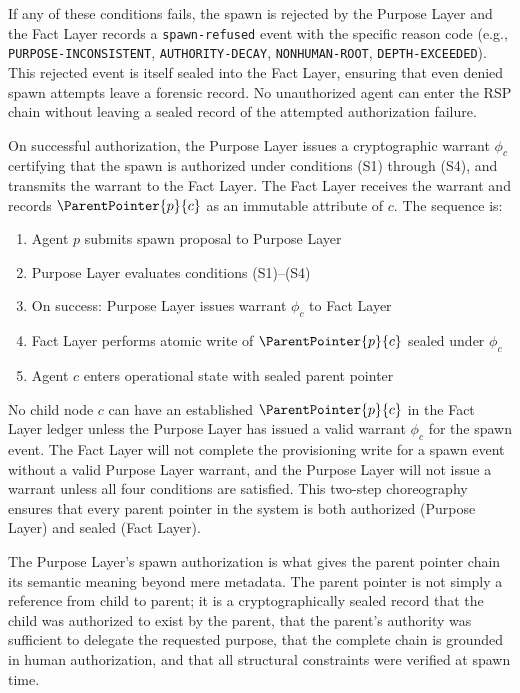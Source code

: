 If any of these conditions fails, the spawn is rejected by the Purpose Layer and the Fact Layer records a \texttt{spawn-refused} event with the specific reason code (e.g., \texttt{PURPOSE-INCONSISTENT}, \texttt{AUTHORITY-DECAY}, \texttt{NONHUMAN-ROOT}, \texttt{DEPTH-EXCEEDED}). This rejected event is itself sealed into the Fact Layer, ensuring that even denied spawn attempts leave a forensic record. No unauthorized agent can enter the RSP chain without leaving a sealed record of the attempted authorization failure.

On successful authorization, the Purpose Layer issues a cryptographic warrant $\phi_c$ certifying that the spawn is authorized under conditions (S1) through (S4), and transmits the warrant to the Fact Layer. The Fact Layer receives the warrant and records $\ParentPointer{p}{c}$ as an immutable attribute of $c$. The sequence is:

\begin{enumerate}
    \item Agent $p$ submits spawn proposal to Purpose Layer
    \item Purpose Layer evaluates conditions (S1)–(S4)
    \item On success: Purpose Layer issues warrant $\phi_c$ to Fact Layer
    \item Fact Layer performs atomic write of $\ParentPointer{p}{c}$ sealed under $\phi_c$
    \item Agent $c$ enters operational state with sealed parent pointer
\end{enumerate}

No child node $c$ can have an established $\ParentPointer{p}{c}$ in the Fact Layer ledger unless the Purpose Layer has issued a valid warrant $\phi_c$ for the spawn event. The Fact Layer will not complete the provisioning write for a spawn event without a valid Purpose Layer warrant, and the Purpose Layer will not issue a warrant unless all four conditions are satisfied. This two-step choreography ensures that every parent pointer in the system is both authorized (Purpose Layer) and sealed (Fact Layer).

The Purpose Layer's spawn authorization is what gives the parent pointer chain its semantic meaning beyond mere metadata. The parent pointer is not simply a reference from child to parent; it is a cryptographically sealed record that the child was authorized to exist by the parent, that the parent's authority was sufficient to delegate the requested purpose, that the complete chain is grounded in human authorization, and that all structural constraints were verified at spawn time.

